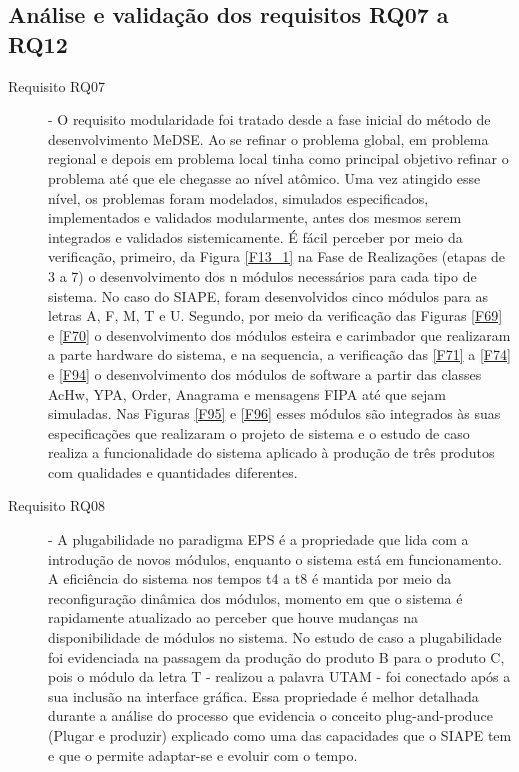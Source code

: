 \subsection{Análise e validação dos requisitos RQ07 a RQ12}	

\begin{description}
	\item[Requisito RQ07] - O requisito modularidade foi tratado desde a fase inicial do método de desenvolvimento MeDSE. Ao se refinar o problema global, em problema regional e depois em problema local tinha como principal objetivo refinar o problema até que ele chegasse ao nível atômico. Uma vez atingido esse nível, os problemas foram modelados, simulados especificados, implementados e validados modularmente, antes dos mesmos serem integrados e validados sistemicamente. É fácil perceber  por meio da verificação, primeiro, da Figura \ref{F13_1} na Fase de Realizações (etapas de 3 a 7) o desenvolvimento dos n módulos necessários para cada tipo de sistema. No caso do SIAPE, foram desenvolvidos cinco módulos para as letras A, F, M, T e U. Segundo, por meio da verificação das Figuras \ref{F69} e \ref{F70} o desenvolvimento dos módulos esteira e carimbador que realizaram a parte hardware do sistema, e na sequencia, a verificação das \ref{F71} a \ref{F74} e \ref{F94} o desenvolvimento dos módulos de software a partir das classes AcHw, YPA, Order, Anagrama e mensagens FIPA até que sejam simuladas. Nas Figuras \ref{F95} e \ref{F96} esses módulos são integrados às suas especificações que realizaram o projeto de sistema e o estudo de caso realiza a funcionalidade do sistema aplicado à produção de três produtos com qualidades e quantidades diferentes. 
	
	  
	\item[Requisito RQ08] - A plugabilidade no paradigma EPS é a propriedade que lida com a introdução de novos módulos, enquanto o sistema está em funcionamento. A eficiência do sistema nos tempos t4 a t8 é mantida por meio da reconfiguração dinâmica dos módulos, momento em que o sistema é rapidamente atualizado ao perceber que houve mudanças na disponibilidade de módulos no sistema. No estudo de caso a plugabilidade foi evidenciada na passagem da produção do produto B para o produto C, pois o módulo da letra T - realizou a palavra UTAM - foi conectado após a sua inclusão na interface gráfica. Essa propriedade é melhor detalhada durante a análise do processo que evidencia o conceito plug-and-produce (Plugar e produzir) explicado como uma das capacidades que  o SIAPE tem e que o permite adaptar-se e evoluir com o tempo.
		

\end{description}
